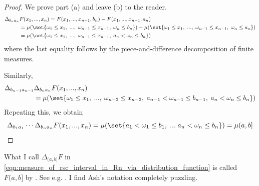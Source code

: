 \documentclass{article} %
\begin{document}
\begin{proof}
We prove part (a) and leave (b) to the reader.
\begin{align*}
\Delta_{b_na_n} &F(x_1, ..., x_n) = 	F(x_1,...,x_{n-1}, b_n) - F(x_1,...,x_{n-1}, a_n)\\
&=\mu(\set{\omega_1 \leq x_1, \; ..., \; \omega_{n-1} \leq x_{n-1}, \; \omega_{n} \leq b_{n}}) - \mu(\set{\omega_1 \leq x_1, \; ..., \; \omega_{n-1} \leq x_{n-1}, \;\omega_{n} \leq a_{n}}) \\
&=\mu(\set{\omega_1 \leq x_1, \; ..., \; \omega_{n-1} \leq x_{n-1}, \; a_n < \omega_{n} \leq b_{n}})
\end{align*}
where the last equality follows by the piece-and-difference decomposition of finite measures.

Similarly, 
\begin{align*}
\Delta_{b_{n-1}a_{n-1}} &\Delta_{b_na_n} F(x_1, ..., x_n) \\
&=\mu(\set{\omega_1 \leq x_1, \;..., \; \omega_{n-2} \leq x_{n-2}, \; a_{n-1} < \omega_{n-1} \leq b_{n-1}, \; a_n < \omega_{n} \leq b_{n}})
\end{align*}
Repeating this, we obtain
\[\Delta_{b_1a_1} \cdots \Delta_{b_na_n} F(x_1, ..., x_n) =  \mu(\set{a_1 < \omega_1 \leq b_1, \; ... \; a_n < \omega_{n} \leq b_{n}}) = \mu(a,b]\]

\end{proof}

\begin{notation}
What I call $\Delta_{(a,b]} F$ in \eqref{eqn:measure_of_rsc_interval_in_Rn_via_distribution_function} is called $F(a,b]$ by \cite{ash2000probability}.  See e.g. \cite[pp.28, or pp.149]{ash2000probability}.  I find Ash's notation completely puzzling.
\label{notation:ash_notation_for_multivariate_distribution_function_applied_to_an_rsc_interval}
\end{notation}
\end{document}
